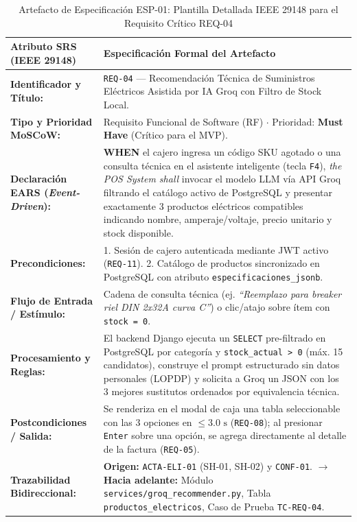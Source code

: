 \begin{table}[htbp]
\centering
\scriptsize
\caption{Artefacto de Especificación ESP-01: Plantilla Detallada IEEE 29148 para el Requisito Crítico REQ-04}
\label{tab:artefacto_especificacion}
\begin{tabularx}{\textwidth}{l Y}
\toprule
\textbf{Atributo SRS (IEEE 29148)} & \textbf{Especificación Formal del Artefacto} \\
\midrule
\textbf{Identificador y Título:} & \texttt{REQ-04} --- Recomendación Técnica de Suministros Eléctricos Asistida por IA Groq con Filtro de Stock Local. \\
\textbf{Tipo y Prioridad MoSCoW:} & Requisito Funcional de Software (RF) $\cdot$ Prioridad: \textbf{Must Have} (Crítico para el MVP). \\
\textbf{Declaración EARS (\textit{Event-Driven}):} & \textbf{WHEN} el cajero ingresa un código SKU agotado o una consulta técnica en el asistente inteligente (tecla \texttt{F4}), \textit{the POS System shall} invocar el modelo LLM vía API Groq filtrando el catálogo activo de PostgreSQL y presentar exactamente 3 productos eléctricos compatibles indicando nombre, amperaje/voltaje, precio unitario y stock disponible. \\
\textbf{Precondiciones:} & 1. Sesión de cajero autenticada mediante JWT activo (\texttt{REQ-11}). 2. Catálogo de productos sincronizado en PostgreSQL con atributo \texttt{especificaciones\_jsonb}. \\
\textbf{Flujo de Entrada / Estímulo:} & Cadena de consulta técnica (ej. \textit{``Reemplazo para breaker riel DIN 2x32A curva C''}) o clic/atajo sobre ítem con \texttt{stock = 0}. \\
\textbf{Procesamiento y Reglas:} & El backend Django ejecuta un \texttt{SELECT} pre-filtrado en PostgreSQL por categoría y \texttt{stock\_actual > 0} (máx. 15 candidatos), construye el prompt estructurado sin datos personales (LOPDP) y solicita a Groq un JSON con los 3 mejores sustitutos ordenados por equivalencia técnica. \\
\textbf{Postcondiciones / Salida:} & Se renderiza en el modal de caja una tabla seleccionable con las 3 opciones en $\le 3.0\text{ s}$ (\texttt{REQ-08}); al presionar \texttt{Enter} sobre una opción, se agrega directamente al detalle de la factura (\texttt{REQ-05}). \\
\textbf{Trazabilidad Bidireccional:} & \textbf{Origen:} \texttt{ACTA-ELI-01} (SH-01, SH-02) y \texttt{CONF-01}. $\rightarrow$ \textbf{Hacia adelante:} Módulo \texttt{services/groq\_recommender.py}, Tabla \texttt{productos\_electricos}, Caso de Prueba \texttt{TC-REQ-04}. \\
\bottomrule
\end{tabularx}
\end{table}

